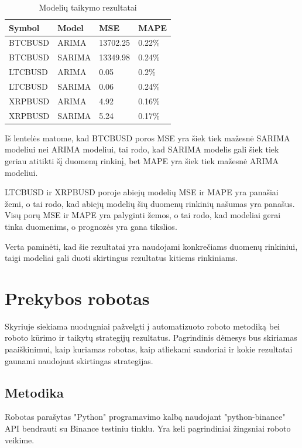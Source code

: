 \documentclass{VUMIFInfKursinis}
\begin{document}
\begin{table}[H]
  \centering
  \begin{tabularx}{\linewidth}{|X|X|X|X|}
    \hline
    Symbol  & Model  & MSE      & MAPE   \\
    \hline
    \hline
    BTCBUSD & ARIMA  & 13702.25 & 0.22\% \\
    \hline
    BTCBUSD & SARIMA & 13349.98 & 0.24\% \\
    \hline
    \hline
    LTCBUSD & ARIMA  & 0.05     & 0.2\%  \\
    \hline
    LTCBUSD & SARIMA & 0.06     & 0.24\% \\
    \hline
    \hline
    XRPBUSD & ARIMA  & 4.92     & 0.16\% \\
    \hline
    XRPBUSD & SARIMA & 5.24     & 0.17\% \\
    \hline
  \end{tabularx}
  \caption{Modelių taikymo rezultatai}
  \label{table:rezultatai}
\end{table}

Iš lentelės matome, kad BTCBUSD poros MSE yra šiek tiek mažesnė SARIMA modeliui nei ARIMA modeliui, tai rodo, kad SARIMA modelis gali šiek tiek geriau atitikti šį duomenų rinkinį, bet MAPE yra šiek tiek mažesnė ARIMA modeliui.

LTCBUSD ir XRPBUSD poroje abiejų modelių MSE ir MAPE yra panašiai žemi, o tai rodo, kad abiejų modelių šių duomenų rinkinių našumas yra panašus. Visų porų MSE ir MAPE yra palyginti žemos, o tai rodo, kad modeliai gerai tinka duomenims, o prognozės yra gana tikslios.

Verta paminėti, kad šie rezultatai yra naudojami konkrečiams duomenų rinkiniui, taigi modeliai gali duoti skirtingus rezultatus kitiems rinkiniams.

\section{Prekybos robotas}
Skyriuje siekiama nuodugniai pažvelgti į automatizuoto roboto metodiką bei roboto kūrimo ir taikytų strategijų rezultatus.
Pagrindinis dėmesys bus skiriamas paaiškinimui, kaip kuriamas robotas, kaip atliekami sandoriai ir kokie rezultatai gaunami naudojant skirtingas strategijas.

\subsection{Metodika}
Robotas parašytas "Python" programavimo kalbą naudojant "python-binance" API bendrauti su Binance testiniu tinklu\cite{trading_robot}. 
Yra keli pagrindiniai žingsniai roboto veikime.
\end{document}
